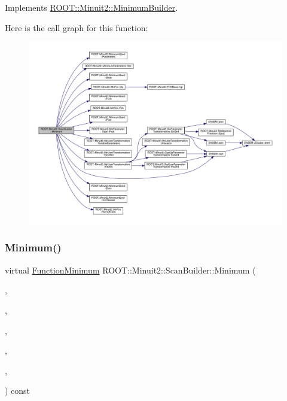 Implements \mbox{\hyperlink{classROOT_1_1Minuit2_1_1MinimumBuilder_aefaa624436afa8195af1f3393a35981f}{R\+O\+O\+T\+::\+Minuit2\+::\+Minimum\+Builder}}.

Here is the call graph for this function\+:
\nopagebreak
\begin{figure}[H]
\begin{center}
\leavevmode
\includegraphics[width=350pt]{d1/d35/classROOT_1_1Minuit2_1_1ScanBuilder_ad53e9711dc8a63958845ac6e6eb5250f_cgraph}
\end{center}
\end{figure}
\mbox{\label{classROOT_1_1Minuit2_1_1ScanBuilder_a24547691823b9f0977e6b23b6d084e7a}} 
\subsubsection{\texorpdfstring{Minimum()}{Minimum()}\hspace{0.1cm}{\footnotesize\ttfamily [2/3]}}
{\footnotesize\ttfamily virtual \mbox{\hyperlink{classROOT_1_1Minuit2_1_1FunctionMinimum}{Function\+Minimum}} R\+O\+O\+T\+::\+Minuit2\+::\+Scan\+Builder\+::\+Minimum (\begin{DoxyParamCaption}\item[{const \mbox{\hyperlink{classROOT_1_1Minuit2_1_1MnFcn}{Mn\+Fcn}} \&}]{,  }\item[{const \mbox{\hyperlink{classROOT_1_1Minuit2_1_1GradientCalculator}{Gradient\+Calculator}} \&}]{,  }\item[{const \mbox{\hyperlink{classROOT_1_1Minuit2_1_1MinimumSeed}{Minimum\+Seed}} \&}]{,  }\item[{const \mbox{\hyperlink{classROOT_1_1Minuit2_1_1MnStrategy}{Mn\+Strategy}} \&}]{,  }\item[{unsigned int}]{,  }\item[{double}]{ }\end{DoxyParamCaption}) const\hspace{0.3cm}{\ttfamily [virtual]}}



